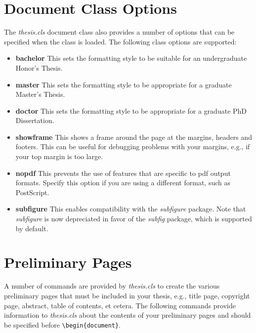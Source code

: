 \documentclass[master]{thesis}
\begin{document}
\section{Document Class Options}

The \textit{thesis.cls} document class also provides a number of options that can be specified when the class is loaded.  The following class options are supported:

\begin{itemize}
    \item \textbf{bachelor}  This sets the formatting style to be suitable for an undergraduate Honor's Thesis.

    \item \textbf{master}  This sets the formatting style to be appropriate for a graduate Master's Thesis.

    \item \textbf{doctor}  This sets the formatting style to be appropriate for a graduate PhD Dissertation.

    \item \textbf{showframe}  This shows a frame around the page at the margins, headers and footers.  This can be useful for debugging problems with your margins, e.g., if your top margin is too large.

    \item \textbf{nopdf}  This prevents the use of features that are specific to pdf output formats.  Specify this option if you are using a different format, such as PostScript.

    \item \textbf{subfigure}  This enables compatibility with the \textit{subfigure} package.  Note that \textit{subfigure} is now depreciated in favor of the \textit{subfig} package, which is supported by default.
\end{itemize}

\section{Preliminary Pages}

A number of commands are provided by \textit{thesis.cls} to create the various preliminary pages that must be included in your thesis, e.g., title page, copyright page, abstract, table of contents, et cetera.  The following commands provide information to \textit{thesis.cls} about the contents of your preliminary pages and should be specified before \verb|\begin{document}|.
\end{document}
